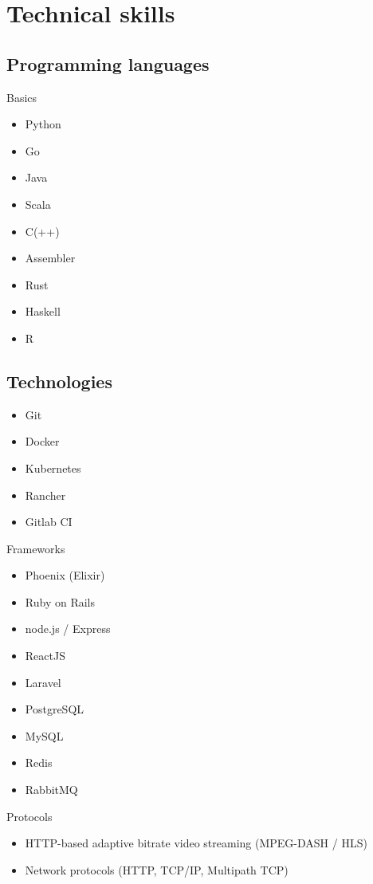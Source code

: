 \documentclass[11pt,a4paper,sans]{moderncv}        %
\begin{document}
\section{Technical skills}
\subsection{\textbf{Programming languages}}
\smallskip
{}
{Basics}{
\begin{itemize}
\item Python
\item Go
\item Java
\item Scala
\item C(++)
\item Assembler
\item Rust
\item Haskell
\item R
\end{itemize}}
\subsection{\textbf{Technologies}}
\smallskip
{}
{
\begin{itemize}
\item Git
\item Docker
\item Kubernetes
\item Rancher
\item Gitlab CI
\end{itemize}
}
{Frameworks}
{
\begin{itemize}
\item Phoenix (Elixir)
\item Ruby on Rails
\item node.js / Express
\item ReactJS
\item Laravel
\end{itemize}
}

\medskip

{
\begin{itemize}
\item PostgreSQL
\item MySQL
\item Redis
\item RabbitMQ
\end{itemize}
}
{Protocols}
{
  \begin{itemize}
    \item HTTP-based adaptive bitrate video streaming (MPEG-DASH / HLS)
    \item Network protocols (HTTP, TCP/IP, Multipath TCP)
  \end{itemize}
}
\end{document}
